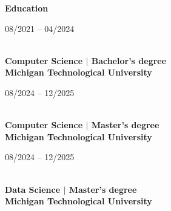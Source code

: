 \textbf{\large Education\normalsize}\\
\begin{greytext}08/2021 – 04/2024\end{greytext}\\
	\textbf{Computer Science $|$ Bachelor's degree\\
Michigan Technological University}
\\
\begin{greytext}08/2024 – 12/2025\end{greytext}\\ 
	\textbf{Computer Science $|$ Master's degree\\
Michigan Technological University}
\\
\begin{greytext}08/2024 – 12/2025\end{greytext}\\
	\textbf{Data Science $|$ Master's degree\\
Michigan Technological University}
\\
